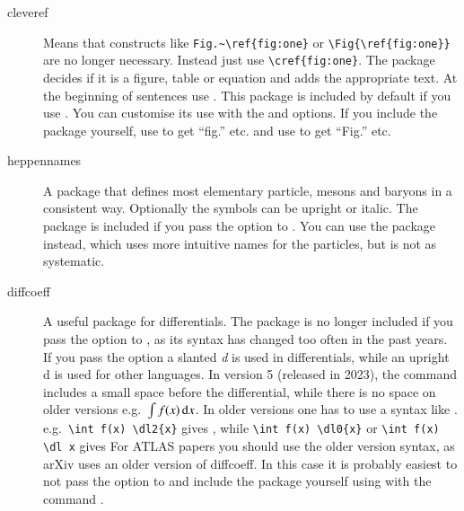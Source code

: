 \begin{description}
  \item[cleveref] Means that constructs like \verb|Fig.~\ref{fig:one}| or
  \verb|\Fig{\ref{fig:one}}| are no longer necessary.
  Instead just use \verb|\cref{fig:one}|.
  The package decides if it is a figure, table or equation and
  adds the appropriate text.
  At the beginning of sentences use .
  This package is included by default if you use .
  You can customise its use with the  and  options.
  If you include the package yourself, use  to get \enquote{fig.} etc. and
  use  to get \enquote{Fig.} etc.

  \item[heppennames] A package that defines most elementary particle, mesons and baryons in a
  consistent way. Optionally the symbols can be upright or italic.
  The package is included if you pass the option  to .
  You can use the package  instead, which uses more intuitive names for the particles,
  but is not as systematic.

  \item[diffcoeff] A useful package for differentials.
   The package is no longer included if you pass the option  to ,
  as its syntax has changed too often in the past years.
  If you pass the option 
  a slanted \textit{d} is used in differentials,
  while an upright \textrm{d} is used for other languages.
  In version 5 (released in 2023), the  command includes a small space before the differential,
  while there is no space on older versions
  e.g.\ \(\int f(x) \dl{x}\).
  In older versions one has to use a syntax like .
  e.g.\ \verb|\int f(x) \dl2{x}| gives
  ,
  while \verb|\int f(x) \dl0{x}| or \verb|\int f(x) \dl x| gives  
  For ATLAS papers you should use the older version syntax, as arXiv uses an older version of diffcoeff.
  In this case it is probably easiest to not pass the option 
   to  and include the package yourself using
  with the command .
  

\end{description}
